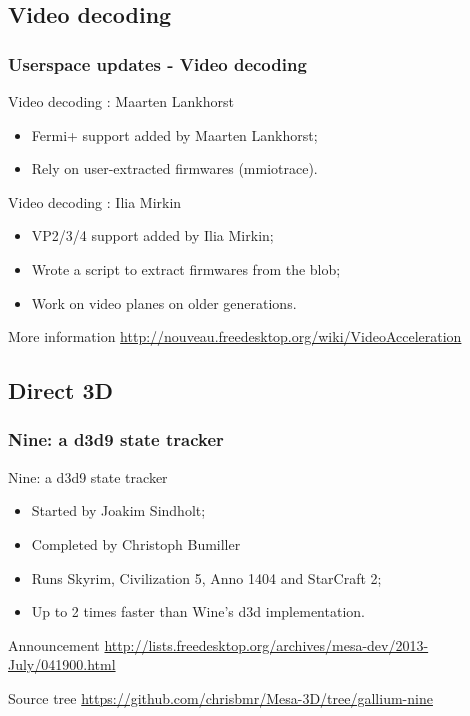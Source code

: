\documentclass[11pt,english,compress]{beamer}
\begin{document}
\subsection{Video decoding}
\begin{frame}
	\frametitle{Userspace updates - Video decoding}

	\begin{block}{Video decoding : Maarten Lankhorst}
		\begin{itemize}
			\item Fermi+ support added by Maarten Lankhorst;
			\item Rely on user-extracted firmwares (mmiotrace).
		\end{itemize}
	\end{block}

	\begin{block}{Video decoding : Ilia Mirkin}
		\begin{itemize}
			\item VP2/3/4 support added by Ilia Mirkin;
			\item Wrote a script to extract firmwares from the blob;
			\item Work on video planes on older generations.
		\end{itemize}
	\end{block}

	\begin{block}{More information}
		\url{http://nouveau.freedesktop.org/wiki/VideoAcceleration}
	\end{block}
\end{frame}

\subsection{Direct 3D}

\begin{frame}
	\frametitle{Nine: a d3d9 state tracker}

	\begin{block}{Nine: a d3d9 state tracker}
		\begin{itemize}
			\item Started by Joakim Sindholt;
			\item Completed by Christoph Bumiller
			\item Runs Skyrim, Civilization 5, Anno 1404 and StarCraft 2;
			\item Up to 2 times faster than Wine's d3d implementation.
		\end{itemize}
	\end{block}

	\begin{block}{Announcement}
		\url{http://lists.freedesktop.org/archives/mesa-dev/2013-July/041900.html}
	\end{block}

	\begin{block}{Source tree}
		\url{https://github.com/chrisbmr/Mesa-3D/tree/gallium-nine}
	\end{block}
\end{frame}
\end{document}

